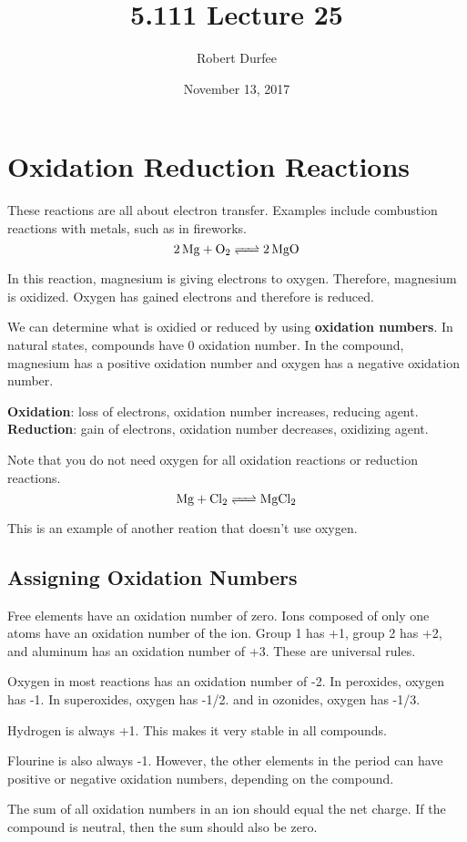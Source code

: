 \documentclass{article}
\title{ 5.111 Lecture 25 }
\author{ Robert Durfee }
\date{ November 13, 2017 }
\begin{document}
\maketitle

\section{ Oxidation Reduction Reactions }

These reactions are all about electron transfer. Examples include combustion
reactions with metals, such as in fireworks. 
$$\ce{2Mg + O_2 <=> 2MgO}$$

In this reaction, magnesium is giving electrons to oxygen. Therefore, magnesium
is oxidized. Oxygen has gained electrons and therefore is reduced.

We can determine what is oxidied or reduced by using \textbf{oxidation numbers}.
In natural states, compounds have 0 oxidation number. In the compound, magnesium
has a positive oxidation number and oxygen has a negative oxidation number.

\textbf{Oxidation}: loss of electrons, oxidation number increases, reducing
agent. \textbf{Reduction}: gain of electrons, oxidation number decreases,
oxidizing agent.

Note that you do not need oxygen for all oxidation reactions or reduction
reactions. 
$$\ce{Mg + Cl_2 <=> MgCl_2}$$

This is an example of another reation that doesn't use oxygen.

\subsection{Assigning Oxidation Numbers}

Free elements have an oxidation number of zero. Ions composed of only one atoms
have an oxidation number of the ion. Group 1 has +1, group 2 has +2, and
aluminum has an oxidation number of +3. These are universal rules. 

Oxygen in most reactions has an oxidation number of -2. In peroxides, oxygen has
-1. In superoxides, oxygen has -1/2. and in ozonides, oxygen has -1/3.

Hydrogen is always +1. This makes it very stable in all compounds.

Flourine is also always -1. However, the other elements in the period can have
positive or negative oxidation numbers, depending on the compound.

The sum of all oxidation numbers in an ion should equal the net charge. If the
compound is neutral, then the sum should also be zero.
\end{document}
